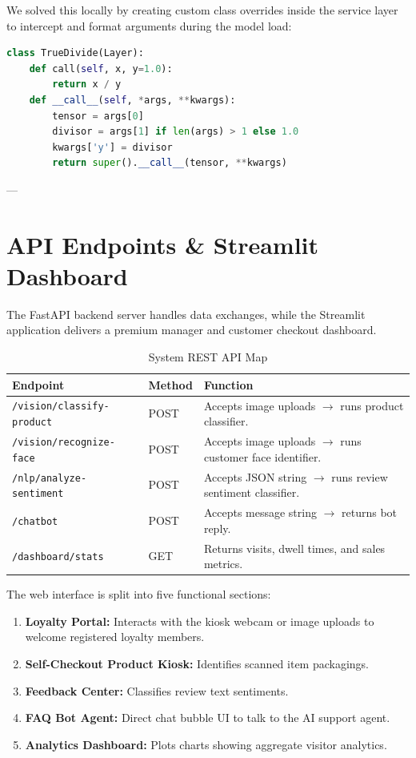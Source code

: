 \documentclass[12pt,a4paper]{article}
\begin{document}
We solved this locally by creating custom class overrides inside the service layer to intercept and format arguments during the model load:

\begin{lstlisting}[language=Python, caption=Custom Keras Override Layers]
class TrueDivide(Layer):
    def call(self, x, y=1.0):
        return x / y
    def __call__(self, *args, **kwargs):
        tensor = args[0]
        divisor = args[1] if len(args) > 1 else 1.0
        kwargs['y'] = divisor
        return super().__call__(tensor, **kwargs)
\end{lstlisting}

---

\section{API Endpoints \& Streamlit Dashboard}
The FastAPI backend server handles data exchanges, while the Streamlit application delivers a premium manager and customer checkout dashboard.

\begin{table}[ht]
\centering
\caption{System REST API Map}
\begin{tabular}{lll}
\toprule
\textbf{Endpoint} & \textbf{Method} & \textbf{Function} \\
\midrule
\texttt{/vision/classify-product} & POST & Accepts image uploads $\to$ runs product classifier. \\
\texttt{/vision/recognize-face} & POST & Accepts image uploads $\to$ runs customer face identifier. \\
\texttt{/nlp/analyze-sentiment} & POST & Accepts JSON string $\to$ runs review sentiment classifier. \\
\texttt{/chatbot} & POST & Accepts message string $\to$ returns bot reply. \\
\texttt{/dashboard/stats} & GET & Returns visits, dwell times, and sales metrics. \\
\bottomrule
\end{tabular}
\end{table}

The web interface is split into five functional sections:
\begin{enumerate}
    \item \textbf{Loyalty Portal:} Interacts with the kiosk webcam or image uploads to welcome registered loyalty members.
    \item \textbf{Self-Checkout Product Kiosk:} Identifies scanned item packagings.
    \item \textbf{Feedback Center:} Classifies review text sentiments.
    \item \textbf{FAQ Bot Agent:} Direct chat bubble UI to talk to the AI support agent.
    \item \textbf{Analytics Dashboard:} Plots charts showing aggregate visitor analytics.
\end{enumerate}
\end{document}
